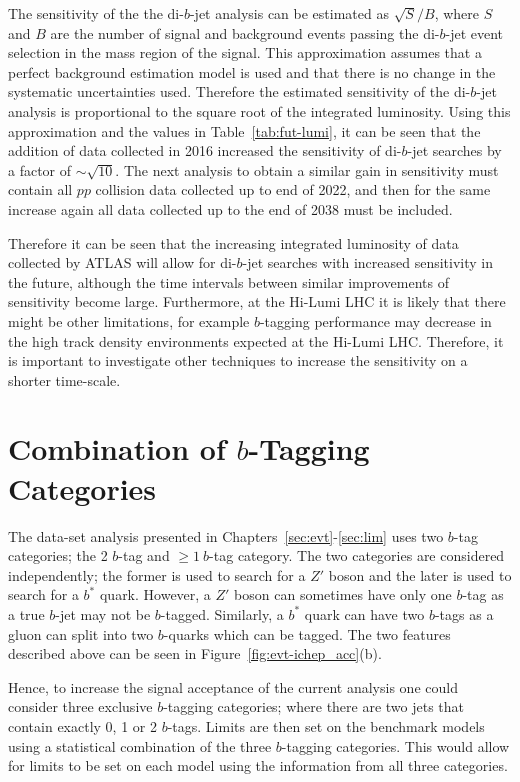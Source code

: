 The sensitivity of the the di-$b$-jet analysis can be estimated as $\sqrt{S}/B$,
where $S$ and $B$ are the number of signal and background events passing the di-$b$-jet event selection in the mass region of the signal.
This approximation assumes that a perfect background estimation model is used and that there is no change in the systematic uncertainties used.
Therefore the estimated sensitivity of the di-$b$-jet analysis is proportional to the square root of the integrated luminosity.
Using this approximation and the values in Table~\ref{tab:fut-lumi}, it can be seen that the addition of data collected in 2016
increased the sensitivity of di-$b$-jet searches by a factor of $\sim\sqrt{10}$.
The next analysis to obtain a similar gain in sensitivity must contain all $pp$ collision data collected up to end of 2022,
and then for the same increase again all data collected up to the end of 2038 must be included.

Therefore it can be seen that the increasing integrated luminosity of data collected by ATLAS will
allow for di-$b$-jet searches with increased sensitivity in the future,
although the time intervals between similar improvements of sensitivity become large.
Furthermore, at the Hi-Lumi LHC it is likely that there might be other limitations,
for example $b$-tagging performance may decrease in the high track density environments expected at the Hi-Lumi LHC.
Therefore, it is important to investigate other techniques to increase the sensitivity on a shorter time-scale.

\section{Combination of $b$-Tagging Categories}

The \summer{} data-set analysis presented in Chapters~\ref{sec:evt}-\ref{sec:lim} uses
two $b$-tag categories; the 2 $b$-tag and $\geq1~b$-tag category.
The two categories are considered independently;
the former is used to search for a $Z'$ boson and the later is used to search for a $b^{*}$ quark.
However, a $Z'$ boson can sometimes have only one $b$-tag as a true $b$-jet may not be $b$-tagged.
Similarly, a $b^*$ quark can have two $b$-tags as a gluon can split into two $b$-quarks which can be tagged.
The two features described above can be seen in Figure~\ref{fig:evt-ichep_acc}(b).

Hence, to increase the signal acceptance of the current analysis one could consider three exclusive $b$-tagging categories;
where there are two jets that contain exactly 0, 1 or 2 $b$-tags.
Limits are then set on the benchmark models using a statistical combination of the three $b$-tagging categories.
This would allow for limits to be set on each model using the information from all three categories.

